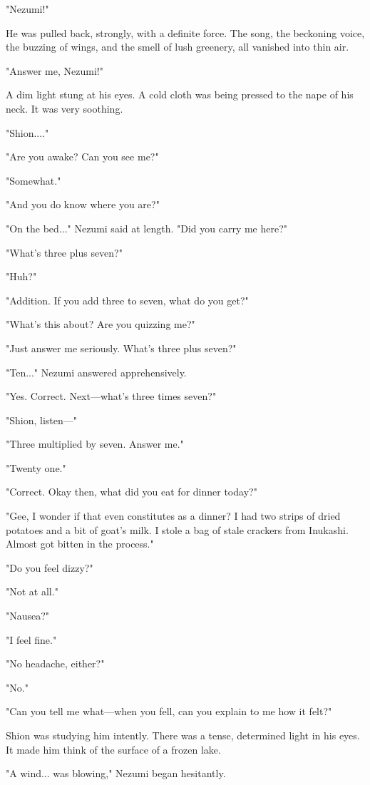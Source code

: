 "Nezumi!"

He was pulled back, strongly, with a definite force. The song, the
beckoning voice, the buzzing of wings, and the smell of lush greenery,
all vanished into thin air.

"Answer me, Nezumi!"

A dim light stung at his eyes. A cold cloth was being pressed to the
nape of his neck. It was very soothing.

"Shion...."

"Are you awake? Can you see me?"

"Somewhat."

"And you do know where you are?"

"On the bed..." Nezumi said at length. "Did you carry me here?"

"What's three plus seven?"

"Huh?"

"Addition. If you add three to seven, what do you get?"

"What's this about? Are you quizzing me?"

"Just answer me seriously. What's three plus seven?"

"Ten..." Nezumi answered apprehensively.

"Yes. Correct. Next---what's three times seven?"

"Shion, listen---"

"Three multiplied by seven. Answer me."

"Twenty one."

"Correct. Okay then, what did you eat for dinner today?"

"Gee, I wonder if that even constitutes as a dinner? I had two strips of
dried potatoes and a bit of goat's milk. I stole a bag of stale crackers
from Inukashi. Almost got bitten in the process."

"Do you feel dizzy?"

"Not at all."

"Nausea?"

"I feel fine."

"No headache, either?"

"No."

"Can you tell me what---when you fell, can you explain to me how it felt?"

Shion was studying him intently. There was a tense, determined light in
his eyes. It made him think of the surface of a frozen lake.

"A wind... was blowing," Nezumi began hesitantly.

